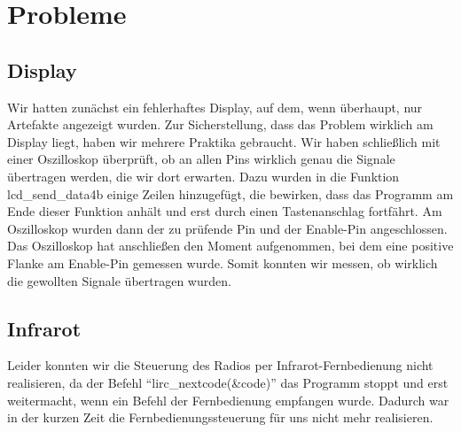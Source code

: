 \section{Probleme}

\subsection{Display}

Wir hatten zunächst ein fehlerhaftes Display, auf dem, wenn überhaupt, nur Artefakte angezeigt wurden. Zur Sicherstellung, dass das Problem wirklich am Display liegt, haben wir mehrere Praktika gebraucht. Wir haben schließlich mit einer Oszilloskop überprüft, ob an allen Pins wirklich genau die Signale übertragen werden, die wir dort erwarten. Dazu wurden in die Funktion lcd\_send\_data4b einige Zeilen hinzugefügt, die bewirken, dass das Programm am Ende dieser Funktion anhält und erst durch einen Tastenanschlag fortfährt. Am Oszilloskop wurden dann der zu prüfende Pin und der Enable-Pin angeschlossen. Das Oszilloskop hat anschließen den Moment aufgenommen, bei dem eine positive Flanke am Enable-Pin gemessen wurde. Somit konnten wir messen, ob wirklich die gewollten Signale übertragen wurden.

\subsection{Infrarot}
Leider konnten wir die Steuerung des Radios per Infrarot-Fernbedienung nicht realisieren, da der Befehl 
\newline
"`lirc\_nextcode(\&code)"'
\newline
das Programm stoppt und erst weitermacht, wenn ein Befehl der Fernbedienung empfangen wurde. Dadurch war in der kurzen Zeit die Fernbedienungssteuerung für uns nicht mehr realisieren.